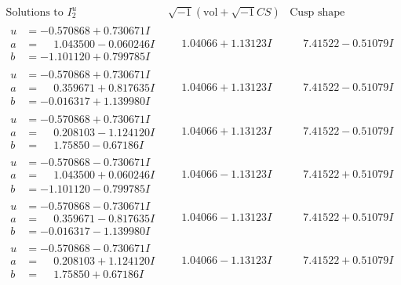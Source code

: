 \documentclass[1p]{elsarticle_modified}
\theoremstyle{definition}
\newcommand{\I}{\sqrt{-1}}
\begin{document}
$$\begin{array}{c|c|c}  
\text{Solutions to }I^u_{2}& \I (\text{vol} + \sqrt{-1}CS) & \text{Cusp shape}\\
 \hline 
\begin{aligned}
u &= -0.570868 + 0.730671 I \\
a &= \phantom{-}1.043500 - 0.060246 I \\
b &= -1.101120 + 0.799785 I\end{aligned}
 & \phantom{-}1.04066 + 1.13123 I & \phantom{-}7.41522 - 0.51079 I \\ \hline\begin{aligned}
u &= -0.570868 + 0.730671 I \\
a &= \phantom{-}0.359671 + 0.817635 I \\
b &= -0.016317 + 1.139980 I\end{aligned}
 & \phantom{-}1.04066 + 1.13123 I & \phantom{-}7.41522 - 0.51079 I \\ \hline\begin{aligned}
u &= -0.570868 + 0.730671 I \\
a &= \phantom{-}0.208103 - 1.124120 I \\
b &= \phantom{-}1.75850 - 0.67186 I\end{aligned}
 & \phantom{-}1.04066 + 1.13123 I & \phantom{-}7.41522 - 0.51079 I \\ \hline\begin{aligned}
u &= -0.570868 - 0.730671 I \\
a &= \phantom{-}1.043500 + 0.060246 I \\
b &= -1.101120 - 0.799785 I\end{aligned}
 & \phantom{-}1.04066 - 1.13123 I & \phantom{-}7.41522 + 0.51079 I \\ \hline\begin{aligned}
u &= -0.570868 - 0.730671 I \\
a &= \phantom{-}0.359671 - 0.817635 I \\
b &= -0.016317 - 1.139980 I\end{aligned}
 & \phantom{-}1.04066 - 1.13123 I & \phantom{-}7.41522 + 0.51079 I \\ \hline\begin{aligned}
u &= -0.570868 - 0.730671 I \\
a &= \phantom{-}0.208103 + 1.124120 I \\
b &= \phantom{-}1.75850 + 0.67186 I\end{aligned}
 & \phantom{-}1.04066 - 1.13123 I & \phantom{-}7.41522 + 0.51079 I \\ \hline\begin{aligned}

\end{aligned}
\end{array}$$
\end{document}
